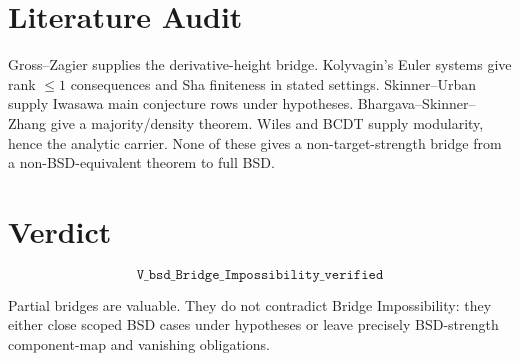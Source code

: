 \documentclass{article}
\begin{document}
\section{Literature Audit}

Gross--Zagier supplies the derivative-height bridge. Kolyvagin's Euler systems give rank \(\le 1\) consequences and Sha finiteness in stated settings. Skinner--Urban supply Iwasawa main conjecture rows under hypotheses. Bhargava--Skinner--Zhang give a majority/density theorem. Wiles and BCDT supply modularity, hence the analytic carrier. None of these gives a non-target-strength bridge from a non-BSD-equivalent theorem to full BSD.

\section{Verdict}

\[
\boxed{\texttt{V\_bsd\_Bridge\_Impossibility\_verified}}
\]

Partial bridges are valuable. They do not contradict Bridge Impossibility: they either close scoped BSD cases under hypotheses or leave precisely BSD-strength component-map and vanishing obligations.
\end{document}
